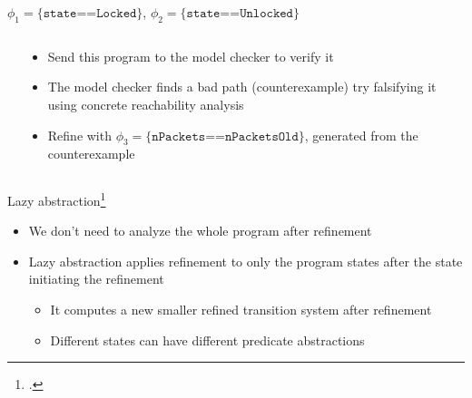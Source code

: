 \documentclass[aspectratio=169]{beamer}
\begin{document}
\begin{frame}{}
  \begingroup\footnotesize\vspace{-0.7em}
  $\phi_1 = \texttt{\{state==Locked\}}$, $\phi_2 = \texttt{\{state==Unlocked\}}$\vspace{-1.7em}
  \begin{columns}[t]
    \begin{column}{0.50\textwidth}
      
    \end{column}\pause
    \begin{column}{0.50\textwidth}
      \begin{center}

        \begin{itemize}\footnotesize
        \item<5-> Send this program to the model checker to verify it
        \item<6-> The model checker finds a bad path (counterexample) try falsifying it using concrete reachability analysis%
        \item<7-> Refine with $\phi_3 = \texttt{\{nPackets==nPacketsOld\}}$, generated from the counterexample
        \end{itemize}
      \end{center}

    \end{column}
  \end{columns}
  \endgroup

\end{frame}

\begin{frame}{Lazy abstraction\footcite{henzinger2002lazy}}
  \begin{itemize}[<+->]
  \item We don't need to analyze the whole program after refinement
  \item Lazy abstraction applies refinement to only the program states after the state initiating the refinement
    \begin{itemize}
    \item It computes a new smaller refined transition system after refinement
    \item Different states can have different predicate abstractions
    \end{itemize}
  \end{itemize}
\end{frame}
\end{document}
